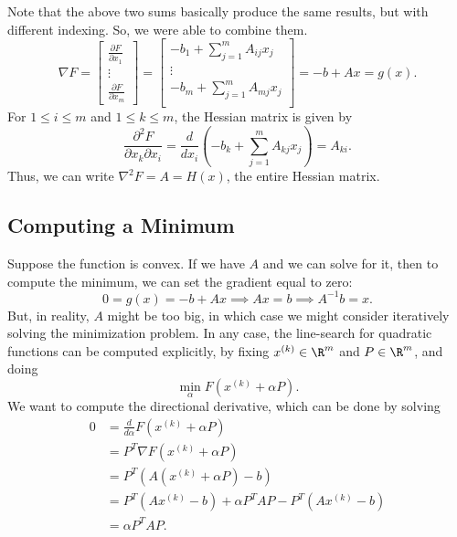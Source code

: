\documentclass[letterpaper]{article}
\begin{document}
Note that the above two sums basically produce the same results, but with different indexing. So, we were able to combine them.
\[\nabla F = \begin{bmatrix}
    \frac{\partial F}{\partial x_1} \\ \vdots \\ \frac{\partial F}{\partial x_m}
\end{bmatrix} = \begin{bmatrix}
    -b_1 + \sum_{j = 1}^{m} A_{ij} x_j \\ 
    \vdots \\
    -b_m + \sum_{j = 1}^{m} A_{mj} x_j \\ 
\end{bmatrix} = -b + Ax = g(x).\]
For $1 \leq i \leq m$ and $1 \leq k \leq m$, the Hessian matrix is given by 
\[\frac{\partial^2 F}{\partial x_k \partial x_i} = \frac{d}{dx_i} \left(-b_{k} + \sum_{j = 1}^{m} A_{kj} x_j\right) = A_{ki}.\]
Thus, we can write $\nabla^2 F = A = H(x)$, the entire Hessian matrix.

\subsection{Computing a Minimum}
Suppose the function is convex. If we have $A$ and we can solve for it, then to compute the minimum, we can set the gradient equal to zero: 
\[0 = g(x) = -b + Ax \implies Ax = b \implies A^{-1} b = x.\]
But, in reality, $A$ might be too big, in which case we might consider iteratively solving the minimization problem. In any case, the line-search for quadratic functions can be computed explicitly, by fixing $x^{(k)} \in \R^m$ and $P \in \R^m$, and doing \[\min_{\alpha} F(x^{(k)} + \alpha P).\]
We want to compute the directional derivative, which can be done by solving 
\[\begin{aligned}
    0 &= \frac{d}{d\alpha} F(x^{(k)} + \alpha P) \\
        &= P^T \nabla F(x^{(k)} + \alpha P) \\
        &= P^T \left(A(x^{(k)} + \alpha P) - b\right) \\
        &= P^T (Ax^{(k)} - b) + \alpha P^T AP - P^T (Ax^{(k)} - b) \\
        &= \alpha P^T A P.    
\end{aligned}\]
\end{document}
